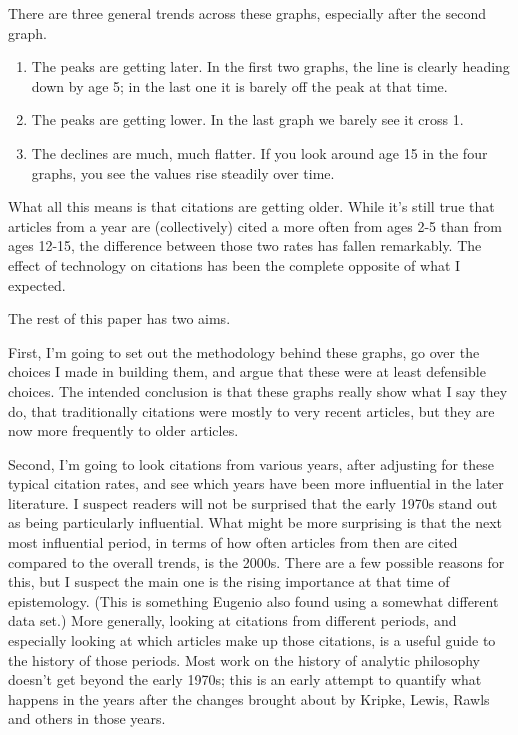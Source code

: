 \documentclass[
]{ergoclass}
\providecommand{\tightlist}{%
  \setlength{\itemsep}{0pt}\setlength{\parskip}{0pt}}
\begin{document}
There are three general trends across these graphs, especially after the
second graph.

\begin{enumerate}
\def\labelenumi{\arabic{enumi}.}
\tightlist
\item
  The peaks are getting later. In the first two graphs, the line is
  clearly heading down by age 5; in the last one it is barely off the
  peak at that time.
\item
  The peaks are getting lower. In the last graph we barely see it cross
  1.
\item
  The declines are much, much flatter. If you look around age 15 in the
  four graphs, you see the values rise steadily over time.
\end{enumerate}

What all this means is that citations are getting older. While it's
still true that articles from a year are (collectively) cited a more
often from ages 2-5 than from ages 12-15, the difference between those
two rates has fallen remarkably. The effect of technology on citations
has been the complete opposite of what I expected.

The rest of this paper has two aims.

First, I'm going to set out the methodology behind these graphs, go over
the choices I made in building them, and argue that these were at least
defensible choices. The intended conclusion is that these graphs really
show what I say they do, that traditionally citations were mostly to
very recent articles, but they are now more frequently to older
articles.

Second, I'm going to look citations from various years, after adjusting
for these typical citation rates, and see which years have been more
influential in the later literature. I suspect readers will not be
surprised that the early 1970s stand out as being particularly
influential. What might be more surprising is that the next most
influential period, in terms of how often articles from then are cited
compared to the overall trends, is the 2000s. There are a few possible
reasons for this, but I suspect the main one is the rising importance at
that time of epistemology. (This is something Eugenio
\citet{Petrovich2024} also found using a somewhat different data set.)
More generally, looking at citations from different periods, and
especially looking at which articles make up those citations, is a
useful guide to the history of those periods. Most work on the history
of analytic philosophy doesn't get beyond the early 1970s; this is an
early attempt to quantify what happens in the years after the changes
brought about by Kripke, Lewis, Rawls and others in those years.
\end{document}
